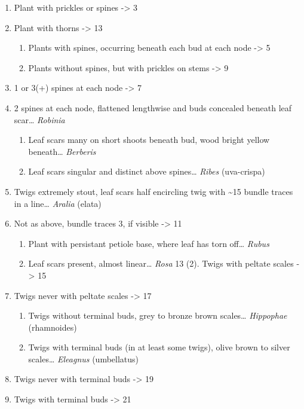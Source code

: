 \documentclass[openany]{book}
\providecommand{\tightlist}{%
  \setlength{\itemsep}{0pt}\setlength{\parskip}{0pt}}
\begin{document}
\begin{enumerate}
\def\labelenumi{\arabic{enumi}.}
\tightlist
\item
  Plant with prickles or spines -\textgreater{} 3
\item
  Plant with thorns -\textgreater{} 13

  \begin{enumerate}
  \def\labelenumii{\arabic{enumii}.}
  \setcounter{enumii}{2}
  \tightlist
  \item
    Plants with spines, occurring beneath each bud at each node
    -\textgreater{} 5
  \item
    Plants without spines, but with prickles on stems -\textgreater{} 9
  \end{enumerate}
\item
  1 or 3(+) spines at each node -\textgreater{} 7
\item
  2 spines at each node, flattened lengthwise and buds concealed beneath
  leaf scar\ldots{} \emph{Robinia}

  \begin{enumerate}
  \def\labelenumii{\arabic{enumii}.}
  \setcounter{enumii}{6}
  \tightlist
  \item
    Leaf scars many on short shoots beneath bud, wood bright yellow
    beneath\ldots{} \emph{Berberis}
  \item
    Leaf scars singular and distinct above spines\ldots{} \emph{Ribes}
    (uva-crispa)
  \end{enumerate}
\item
  Twigs extremely stout, leaf scars half encircling twig with
  \textasciitilde{}15 bundle traces in a line\ldots{} \emph{Aralia}
  (elata)
\item
  Not as above, bundle traces 3, if visible -\textgreater{} 11

  \begin{enumerate}
  \def\labelenumii{\arabic{enumii}.}
  \setcounter{enumii}{10}
  \tightlist
  \item
    Plant with persistant petiole base, where leaf has torn off\ldots{}
    \emph{Rubus}
  \item
    Leaf scars present, almost linear\ldots{} \emph{Rosa} 13 (2). Twigs
    with peltate scales -\textgreater{} 15
  \end{enumerate}
\item
  Twigs never with peltate scales -\textgreater{} 17

  \begin{enumerate}
  \def\labelenumii{\arabic{enumii}.}
  \setcounter{enumii}{14}
  \tightlist
  \item
    Twigs without terminal buds, grey to bronze brown scales\ldots{}
    \emph{Hippophae} (rhamnoides)
  \item
    Twigs with terminal buds (in at least some twigs), olive brown to
    silver scales\ldots{} \emph{Eleagnus} (umbellatus)
  \end{enumerate}
\item
  Twigs never with terminal buds -\textgreater{} 19
\item
  Twigs with terminal buds -\textgreater{} 21


\end{enumerate}
\end{document}
